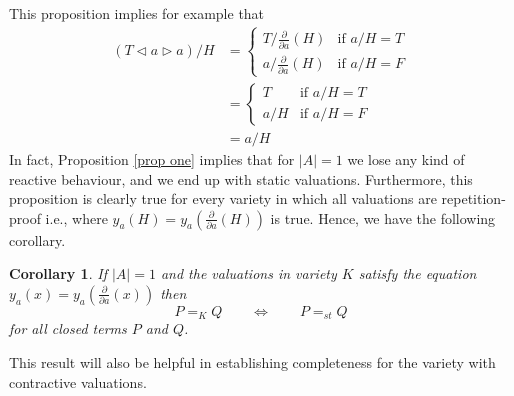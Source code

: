 \documentclass[a4paper,twoside,openright]{report}
\newcommand{\dd}[1]{\frac{\partial}{\partial #1}}
\newcommand{\lef}{\ensuremath{\triangleleft}}
\newcommand{\rig}{\ensuremath{\triangleright}}
\newtheorem{cor}[theorem]{Corollary}
\begin{document}
This proposition implies for example that
\begin{align*}
(T\lef a\rig a)/H
&=\begin{cases}
T/\dd a(H) & \text{if $a/H=T$}\\
a/\dd a(H) & \text{if $a/H=F$}
\end{cases}\\
&=\begin{cases}
T & \text{if $a/H=T$}\\
a/H & \text{if $a/H=F$}
\end{cases}\\
&= a/H
\end{align*}
In fact, Proposition \ref{prop one} implies that for $|A|=1$ we lose any kind of reactive behaviour, and we end up with static valuations. Furthermore, this proposition is clearly true for every variety in which all valuations are repetition-proof i.e., where $y_a(H)=y_a(\dd a(H))$ is true. Hence, we have the following corollary.
\begin{cor}\label{cor one}
If $|A|=1$ and the valuations in variety $K$ satisfy the equation $y_a(x)=y_a(\dd a(x))$ then
\[
P=_K Q\qquad\Longleftrightarrow\qquad P=_{st}Q
\]
for all closed terms $P$ and $Q$.
\end{cor}
This result will also be helpful in establishing completeness for the variety with contractive valuations.
\end{document}
